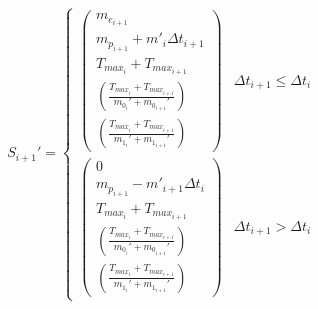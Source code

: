 \begin{equation}
    S_{i+1}' =
        \begin{cases}
            \begin{pmatrix}
                m_{e_{i+1}} \\
                m_{p_{i+1}} + {m'}_{i}{\Delta{}t}_{i+1} \\
                T_{max_{i}} + T_{max_{i+1}} \\
                \left(\frac{T_{max_{i}} + T_{max_{i+1}}}{m_{0_i}'+m_{0_{i+1}}'}\right) \\
                \left(\frac{T_{max_{i}} + T_{max_{i+1}}}{m_{1_i}'+m_{1_{i+1}}'}\right)
            \end{pmatrix} &
            {\Delta{}t}_{i+1} \leq {\Delta{}t}_{i} \\
            \begin{pmatrix}
                0 \\
                m_{p_{i+1}} - {m'}_{i+1}{\Delta{}t}_{i} \\
                T_{max_{i}} + T_{max_{i+1}} \\
                \left(\frac{T_{max_{i}} + T_{max_{i+1}}}{m_{0_i}'+m_{0_{i+1}}'}\right) \\
                \left(\frac{T_{max_{i}} + T_{max_{i+1}}}{m_{1_i}'+m_{1_{i+1}}'}\right)
            \end{pmatrix} &
            {\Delta{}t}_{i+1} > {\Delta{}t}_{i}
        \end{cases}
\end{equation}
